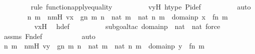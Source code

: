 \begin{isabellebody}
\ \ \ \ \ \ \ \ \isamarkupfalse%
{\isacharparenleft}{\kern0pt}rule\ function{\isacharunderscore}{\kern0pt}apply{\isacharunderscore}{\kern0pt}equality{\isacharparenright}{\kern0pt}\isanewline
\ \ \ \ \ \ \ \ \isamarkupfalse%
\ vyH\ htype\ Pi{\isacharunderscore}{\kern0pt}def\isanewline
\ \ \ \ \ \ \ \ \isamarkupfalse%
\ auto\isanewline
\isanewline
\ \ \ \ \ \ \isamarkupfalse%
\ n\ m\ \ nmH{\isacharcolon}{\kern0pt}\ {\isachardoublequoteopen}vx\ {\isacharequal}{\kern0pt}\ g{\isacharbackquote}{\kern0pt}{\isacharless}{\kern0pt}n{\isacharcomma}{\kern0pt}\ m{\isachargreater}{\kern0pt}{\isachardoublequoteclose}\ {\isachardoublequoteopen}n\ {\isasymin}\ nat{\isachardoublequoteclose}\ {\isachardoublequoteopen}m\ {\isasymin}\ nat{\isachardoublequoteclose}\ {\isachardoublequoteopen}{\isacharless}{\kern0pt}n{\isacharcomma}{\kern0pt}\ m{\isachargreater}{\kern0pt}\ {\isasymin}\ domain{\isacharparenleft}{\kern0pt}p{\isacharparenright}{\kern0pt}{\isachardoublequoteclose}\ {\isachardoublequoteopen}x\ {\isacharequal}{\kern0pt}\ {\isacharless}{\kern0pt}f{\isacharbackquote}{\kern0pt}n{\isacharcomma}{\kern0pt}\ m{\isachargreater}{\kern0pt}{\isachardoublequoteclose}\ \isanewline
\ \ \ \ \ \ \ \ \isamarkupfalse%
\ vxH\ \isamarkupfalse%
\ h{\isacharunderscore}{\kern0pt}def\ \isanewline
\ \ \ \ \ \ \ \ \isamarkupfalse%
{\isacharparenleft}{\kern0pt}subgoal{\isacharunderscore}{\kern0pt}tac\ {\isachardoublequoteopen}domain{\isacharparenleft}{\kern0pt}p{\isacharparenright}{\kern0pt}\ {\isasymsubseteq}\ nat\ {\isasymtimes}\ nat{\isachardoublequoteclose}{\isacharcomma}{\kern0pt}\ force{\isacharparenright}{\kern0pt}\isanewline
\ \ \ \ \ \ \ \ \isamarkupfalse%
\ assms\ Fn{\isacharunderscore}{\kern0pt}def\ \isanewline
\ \ \ \ \ \ \ \ \isamarkupfalse%
\ auto\isanewline
\ \ \ \ \ \ \isamarkupfalse%
\ n{\isacharprime}{\kern0pt}\ m{\isacharprime}{\kern0pt}\ \ n{\isacharprime}{\kern0pt}m{\isacharprime}{\kern0pt}H{\isacharcolon}{\kern0pt}\ {\isachardoublequoteopen}vy\ {\isacharequal}{\kern0pt}\ g{\isacharbackquote}{\kern0pt}{\isacharless}{\kern0pt}n{\isacharprime}{\kern0pt}{\isacharcomma}{\kern0pt}\ m{\isacharprime}{\kern0pt}{\isachargreater}{\kern0pt}{\isachardoublequoteclose}\ {\isachardoublequoteopen}n{\isacharprime}{\kern0pt}\ {\isasymin}\ nat{\isachardoublequoteclose}\ {\isachardoublequoteopen}m{\isacharprime}{\kern0pt}\ {\isasymin}\ nat{\isachardoublequoteclose}\ {\isachardoublequoteopen}{\isacharless}{\kern0pt}n{\isacharprime}{\kern0pt}{\isacharcomma}{\kern0pt}\ m{\isacharprime}{\kern0pt}{\isachargreater}{\kern0pt}\ {\isasymin}\ domain{\isacharparenleft}{\kern0pt}p{\isacharparenright}{\kern0pt}{\isachardoublequoteclose}\ {\isachardoublequoteopen}y\ {\isacharequal}{\kern0pt}\ {\isacharless}{\kern0pt}f{\isacharbackquote}{\kern0pt}n{\isacharprime}{\kern0pt}{\isacharcomma}{\kern0pt}\ m{\isacharprime}{\kern0pt}{\isachargreater}{\kern0pt}{\isachardoublequoteclose}\ \isanewline

\end{isabellebody}

